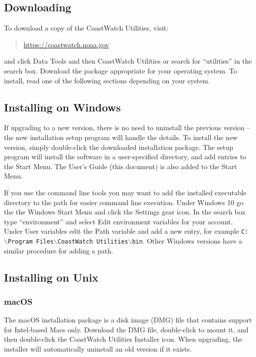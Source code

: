 \subsection{Downloading}

To download a copy of the CoastWatch Utilities, visit:
\begin{quote}
  \url{https://coastwatch.noaa.gov}
\end{quote}
and click {\gui Data Tools} and then {\gui CoastWatch Utilities} or 
search for ``utilities'' in the search box.  Download the package 
appropriate for your operating system. To install, read one of the following sections
depending on your system.

\subsection{Installing on Windows}

If upgrading to a new version, there is no need to uninstall the
previous version -- the new installation setup program will handle
the details.  To install the new version, simply double-click the
downloaded installation package. The setup program will install the
software in a user-specified directory, and add entries to the Start
Menu.  The User's Guide (this document) is also added to the Start
Menu.

If you use the command line tools you may want to add the installed
executable directory to the path for easier command line execution.  Under
Windows 10 go the the Windows {\gui Start Menu} and click the
{\gui Settings} gear icon.  In the search box type ``environment'' and select
{\gui Edit environment variables for your account}.  Under {\gui User variables}
edit the {\gui Path} variable and add a new entry, for example
{\tt C:$\backslash$Program Files$\backslash$CoastWatch Utilities$\backslash$bin}.
Other Windows versions have a similar procedure for adding a path.

\subsection{Installing on Unix}

\subsubsection{macOS}

The macOS installation package is a disk image (DMG) file that
contains support for Intel-based Macs only.  Download the DMG file,
double-click to mount it, and then
double-click the {\gui CoastWatch Utilities Installer} icon.
When upgrading, the installer will automatically uninstall an old version if
it exists.

